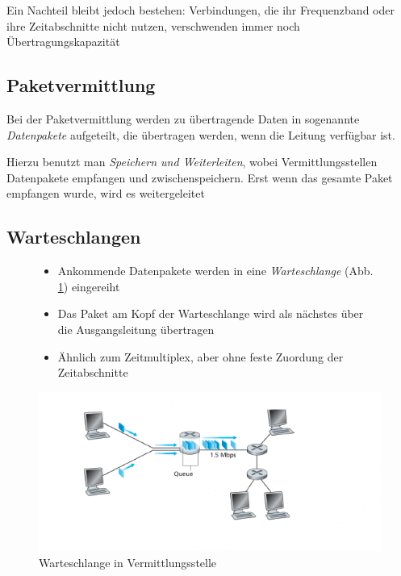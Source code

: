 \documentclass[12pt]{report}
\begin{document}
Ein Nachteil bleibt jedoch bestehen: Verbindungen, die ihr Frequenzband oder ihre Zeitabschnitte nicht nutzen,
verschwenden immer noch Übertragungskapazität

\subsection{Paketvermittlung}
\begin{defbox}
  Bei der Paketvermittlung werden zu übertragende Daten in sogenannte \textit{Datenpakete} aufgeteilt,
  die übertragen werden, wenn die Leitung verfügbar ist.

  Hierzu benutzt man \textit{Speichern und Weiterleiten}, 
  wobei Vermittlungsstellen Datenpakete empfangen und zwischenspeichern. 
  Erst wenn das gesamte Paket empfangen wurde, wird es weitergeleitet
\end{defbox}

\subsection{Warteschlangen}
\begin{figure}[H]
  \begin{minipage}[t]{0.45\textwidth}
    \begin{itemize}
      \item Ankommende Datenpakete werden in eine \textit{Warteschlange} (Abb. \ref{fig:warteschlange}) eingereiht
      \item Das Paket am Kopf der Warteschlange wird als nächstes über die Ausgangsleitung übertragen
      \item Ähnlich zum Zeitmultiplex, aber ohne feste Zuordung der Zeitabschnitte
    \end{itemize}
  \end{minipage}
  \hfill
  \begin{minipage}[t]{0.45\textwidth}
    \caption{Warteschlange in Vermittlungsstelle}
    \label{fig:warteschlange}
    \centering
    \includegraphics[width=1.2\textwidth]{warteschlange}
  \end{minipage}
\end{figure}
\end{document}
